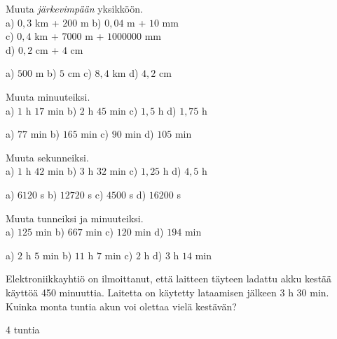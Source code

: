 
\begin{tehtavasivu}

\begin{tehtava}
Muuta \emph{järkevimpään} yksikköön. \\
a) $0,3$ km + $200$ m \qquad
b) $0,04$ m + $10$ mm \\
c) $0,4$ km + $7000$ m + $1000000$ mm \\
d) $0,2$ cm + $4$ cm
\begin{vastaus}
a) $500$ m \qquad
b) $5$ cm \qquad
c) $8,4$ km \qquad
d) $4,2$ cm
\end{vastaus}
\end{tehtava}

\begin{tehtava}
Muuta minuuteiksi. \\
a) $1$ h $17$ min \qquad
b) $2$ h $45$ min \qquad
c) $1,5$ h \qquad
d) $1,75$ h
\begin{vastaus}
a) $77$ min \qquad
b) $165$ min \qquad
c) $90$ min \qquad
d) $105$ min
\end{vastaus}
\end{tehtava}

\begin{tehtava}
Muuta sekunneiksi. \\
a) $1$ h $42$ min \qquad
b) $3$ h $32$ min \qquad
c) $1,25$ h \qquad
d) $4,5$ h
\begin{vastaus}
a) $6120$ s \qquad
b) $12720$ s \qquad
c) $4500$ s \qquad
d) $16200$ s
\end{vastaus}
\end{tehtava}

\begin{tehtava}
Muuta tunneiksi ja minuuteiksi. \\
a) $125$ min \qquad
b) $667$ min \qquad
c) $120$ min \qquad
d) $194$ min
\begin{vastaus}
a) $2$ h $5$ min \qquad
b) $11$ h $7$ min \qquad
c) $2$ h \qquad
d) $3$ h $14$ min
\end{vastaus}
\end{tehtava}

\begin{tehtava}
Elektroniikkayhtiö on ilmoittanut, että laitteen täyteen ladattu akku kestää käyttöä 450 minuuttia.
Laitetta on käytetty lataamisen jälkeen 3 h 30 min. Kuinka monta tuntia akun voi olettaa vielä kestävän?
\begin{vastaus}
4 tuntia
\end{vastaus}
\end{tehtava}


\end{tehtavasivu}
